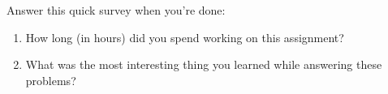 \documentclass[12pt,letterpaper,boxed,cm]{hmcpset}
\begin{document}
\begin{problem} Answer this quick survey when you’re done:
    \begin{enumerate}[label=\Alph*.]
        \item How long (in hours) did you spend working on this assignment?
        \item What was the most interesting thing you learned while answering these problems? 
    \end{enumerate}
   
\end{problem}

\begin{solution}
    \vfill
\end{solution}
\newpage
\end{document}
